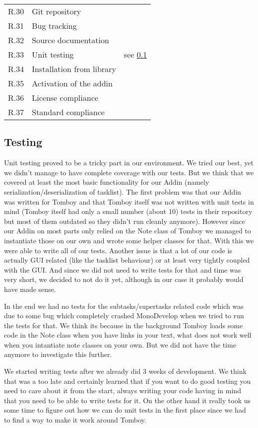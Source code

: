 \begin{tabular}{lll}
\completed	R.30	& Git repository & \\
\completed	R.31	& Bug tracking & \\
\completed	R.32	& Source documentation & \\
\parts		R.33	& Unit testing & see \ref{testing}\\
\completed	R.34	& Installation from library & \\
\completed	R.35	& Activation of the addin & \\
\completed	R.36	& License compliance & \\
\completed	R.37	& Standard compliance & \\
\end{tabular}


\subsection{Testing}
\label{testing}
Unit testing proved to be a tricky part in our environment. We tried our best, yet we didn't manage to have complete coverage with our tests. But we think that we covered at least the most basic functionality for our Addin (namely serialization/deserialization of tasklist).
The first problem was that our Addin was written for Tomboy and that Tomboy itself was not written with unit tests in mind (Tomboy itself had only a small number (about 10) tests in their repository but most of them outdated so they didn't run cleanly anymore). However since our Addin on most parts only relied on the Note class of Tomboy we managed to instantiate those on our own and wrote some helper classes for that. With this we were able to write all of our tests.
Another issue is that a lot of our code is actually GUI related (like the tasklist behaviour) or at least very tightly coupled with the GUI. And since we did not need to write tests for that and time was very short, we decided to not do it yet, although in our case it probably would have made sense.

In the end we had no tests for the subtasks/supertasks related code which was due to some bug which completely crashed MonoDevelop when we tried to run the tests for that. We think its because in the background Tomboy loads some code in the Note class when you have links in your text, what does not work well when you intantiate note classes on your own. But we did not have the time anymore to investigate this further.

We started writing tests after we already did 3 weeks of development. We think that was a too late and certainly learned that if you want to do good testing you need to care about it from the start, always writing your code having in mind that you need to be able to write tests for it. On the other hand it really took us some time to figure out how we can do unit tests in the first place since we had to find a way to make it work around Tomboy.